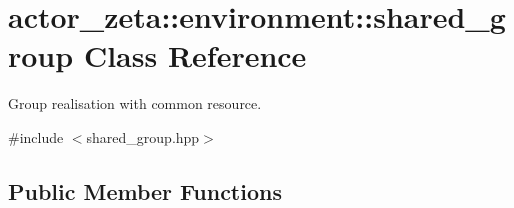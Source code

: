 \hypertarget{classactor__zeta_1_1environment_1_1shared__group}{}\section{actor\+\_\+zeta\+:\+:environment\+:\+:shared\+\_\+group Class Reference}
\label{classactor__zeta_1_1environment_1_1shared__group}


Group realisation with common resource.  




{\ttfamily \#include $<$shared\+\_\+group.\+hpp$>$}

\subsection*{Public Member Functions}
